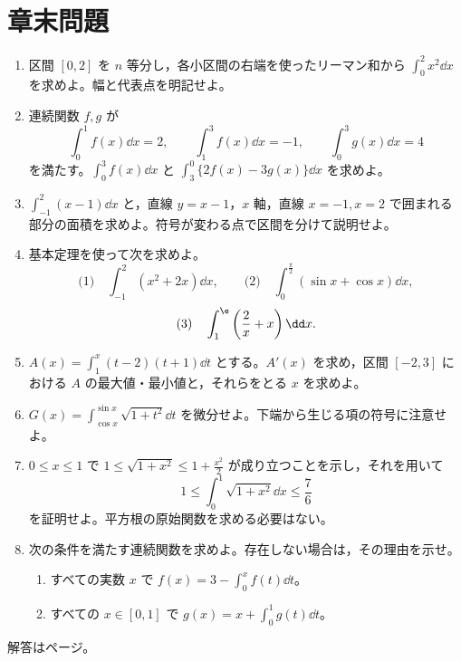 \section*{章末問題}
\begin{enumerate}[label=\textbf{\thechapter.\arabic*},leftmargin=*]
 \item\label{問:定積分リーマン和} 区間 $[0,2]$ を $n$ 等分し，各小区間の右端を使ったリーマン和から $\int_0^2x^2\dd x$ を求めよ。幅と代表点を明記せよ。
 \item\label{問:定積分性質} 連続関数 $f,g$ が
 \[
  \int_0^1f(x)\dd x=2,\qquad
  \int_1^3f(x)\dd x=-1,\qquad
  \int_0^3g(x)\dd x=4
 \]
 を満たす。$\int_0^3f(x)\dd x$ と $\int_3^0\{2f(x)-3g(x)\}\dd x$ を求めよ。
 \item\label{問:定積分と面積} $\int_{-1}^2(x-1)\dd x$ と，直線 $y=x-1$，$x$ 軸，直線 $x=-1,x=2$ で囲まれる部分の面積を求めよ。符号が変わる点で区間を分けて説明せよ。
 \item\label{問:基本定理計算} 基本定理を使って次を求めよ。
 \[
  \text{(1)}\quad\int_{-1}^2(x^2+2x)\dd x,\qquad
  \text{(2)}\quad\int_0^{\frac\pi2}(\sin x+\cos x)\dd x,
 \]
 \[
  \text{(3)}\quad\int_1^{\e}\left(\frac2x+x\right)\dd x.
 \]
 \item\label{問:面積関数増減} $A(x)=\int_1^x(t-2)(t+1)\dd t$ とする。$A'(x)$ を求め，区間 $[-2,3]$ における $A$ の最大値・最小値と，それらをとる $x$ を求めよ。
 \item\label{問:変数上下端} $G(x)=\int_{\cos x}^{\sin x}\sqrt{1+t^2}\dd t$ を微分せよ。下端から生じる項の符号に注意せよ。
 \item\label{問:積分の評価} $0\le x\le1$ で $1\le\sqrt{1+x^2}\le1+\frac{x^2}{2}$ が成り立つことを示し，それを用いて
 \[
  1\le\int_0^1\sqrt{1+x^2}\dd x\le\frac76
 \]
 を証明せよ。平方根の原始関数を求める必要はない。
 \item\label{問:積分方程式基本} 次の条件を満たす連続関数を求めよ。存在しない場合は，その理由を示せ。
 \begin{enumerate}[label=(\arabic*),leftmargin=*]
  \item すべての実数 $x$ で $f(x)=3-\int_0^x f(t)\dd t$。
  \item すべての $x\in[0,1]$ で $g(x)=x+\int_0^1g(t)\dd t$。
 \end{enumerate}
\end{enumerate}

\smallskip\noindent 解答は\pageref{解答:第3章}ページ。
